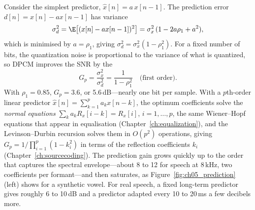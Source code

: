 Consider the simplest predictor, $\hat x[n]=a\,x[n-1]$. The prediction error
$d[n]=x[n]-ax[n-1]$ has variance
\begin{equation}
\sigma_d^2=\E\big[(x[n]-ax[n-1])^2\big]=\sigma_x^2\,(1-2a\rho_1+a^2),
\end{equation}
which is minimised by $a=\rho_1$, giving $\sigma_d^2=\sigma_x^2(1-\rho_1^2)$. For a fixed number
of bits, the quantization noise is proportional to the variance of what is quantized, so DPCM
improves the SNR by the 
\begin{equation}
G_p=\frac{\sigma_x^2}{\sigma_d^2}=\frac{1}{1-\rho_1^2}\quad\text{(first order)}.
\label{eq:ch05:gp}
\end{equation}
With $\rho_1=0.85$, $G_p=3.6$, or 5.6\,dB---nearly one bit per sample. With a $p$th-order
linear predictor $\hat x[n]=\sum_{k=1}^pa_kx[n-k]$, the optimum coefficients solve the
\emph{normal equations} $\sum_ka_kR_x[i-k]=R_x[i]$, $i=1,\dots,p$, the same Wiener--Hopf
equations that appear in equalisation (Chapter~\ref{ch:equalization}), and the
Levinson--Durbin recursion solves them in $O(p^2)$ operations, giving
$G_p=1/\prod_{i=1}^p(1-k_i^2)$ in terms of the reflection coefficients $k_i$
(Chapter~\ref{ch:sourcecoding}). The prediction gain grows quickly up to the order that
captures the spectral envelope---about 8 to 12 for speech at 8\,kHz, two coefficients per
formant---and then saturates, as Figure~\ref{fig:ch05_prediction} (left) shows for a synthetic
vowel. For real speech, a fixed long-term predictor gives roughly 6 to 10\,dB and a predictor
adapted every 10 to 20\,ms a few decibels more.

